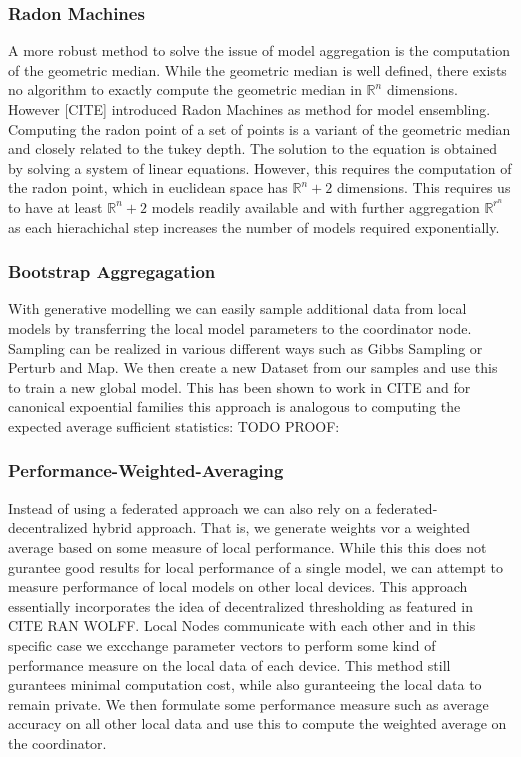 \subsubsection{Radon Machines}
A more robust method to solve the issue of model aggregation is the computation of the geometric median.
While the geometric median is well defined, there exists no algorithm to exactly compute the geometric median in $\mathbb{R}^n$ dimensions.
However [CITE] introduced Radon Machines as method for model ensembling.
Computing the radon point of a set of points is a variant of the geometric median and closely related to the tukey depth. 
The solution to the equation is obtained by solving a system of linear equations.
However, this requires the computation of the radon point, which in euclidean space has $\mathbb{R}^n + 2$ dimensions.
This requires us to have at least $\mathbb{R}^n + 2$ models readily available and with further aggregation $\mathbb{R}^{r^n}$ as each hierachichal step increases the number of models required exponentially.

\subsubsection{Bootstrap Aggregagation}
With generative modelling we can easily sample additional data from local models by transferring the local model parameters to the coordinator node.
Sampling can be realized in various different ways such as Gibbs Sampling or Perturb and Map.
We then create a new Dataset from our samples and use this to train a new global model. 
This has been shown to work in CITE and for canonical expoential families this approach is analogous to computing the expected average sufficient statistics:
TODO PROOF:


\subsubsection{Performance-Weighted-Averaging}
Instead of using a federated approach we can also rely on a federated-decentralized hybrid approach. 
That is, we generate weights vor a weighted average based on some measure of local performance.
While this this does not gurantee good results for local performance of a single model, we can attempt to measure performance of local models on other local devices.
This approach essentially incorporates the idea of decentralized thresholding as featured in CITE RAN WOLFF.
Local Nodes communicate with each other and in this specific case we excchange parameter vectors to perform some kind of performance measure on the local data of each device.
This method still gurantees minimal computation cost, while also guranteeing the local data to remain private.
We then formulate some performance measure such as average accuracy on all other local data and use this to compute the weighted average on the coordinator.

